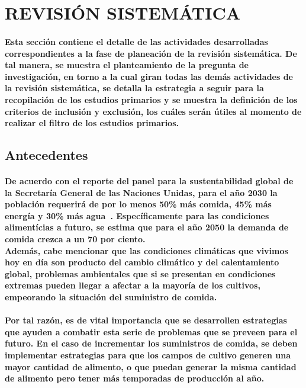 \documentclass[10pt, twocolumn]{article}
\begin{document}
\section{REVISIÓN SISTEMÁTICA}
\paragraph{Esta sección contiene el detalle de las actividades desarrolladas correspondientes a la fase de planeación de la revisión sistemática. De tal manera, se muestra el planteamiento de la pregunta de investigación, en torno a la cual giran todas las demás actividades de la revisión sistemática, se detalla la estrategia a seguir para la recopilación de los estudios primarios y se muestra la definición de los criterios de inclusión y exclusión, los cuáles serán útiles al momento de realizar el filtro de los estudios primarios.}

\subsection{Antecedentes}
\paragraph{De acuerdo con el reporte del panel para la sustentabilidad global de la Secretaría General de las Naciones Unidas, para el año 2030 la población requerirá de por lo menos 50\% más comida, 45\% más energía y 30\% más agua~\cite{globalsustainabilityreport}. Específicamente para las condiciones alimentícias a futuro, se estima que para el año 2050 la demanda de comida crezca a un 70 por ciento. \\ Además, cabe mencionar que las condiciones climáticas que vivimos hoy en día son producto del cambio climático y del calentamiento global, problemas ambientales que si se presentan en condiciones extremas pueden llegar a afectar a la mayoría de los cultivos, empeorando la situación del suministro de comida.}

\paragraph{Por tal razón, es de vital importancia que se desarrollen estrategias que ayuden a combatir esta serie de problemas que se preveen para el futuro. En el caso de incrementar los suministros de comida, se deben implementar estrategias para que los campos de cultivo generen una mayor cantidad de alimento, o que puedan generar la misma cantidad de alimento pero tener más temporadas de producción al año.}
\end{document}
